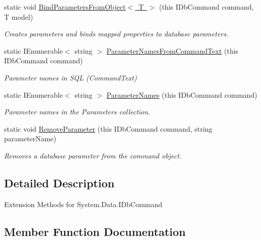 \begin{DoxyCompactItemize}
static void \mbox{\hyperlink{class_blue_cloud_1_1_extensions_1_1_data_1_1_i_db_command_extensions_ae1ef7c72419b652eba87c1c7e36ea0f9}{Bind\+Parameters\+From\+Object$<$ T $>$}} (this I\+Db\+Command command, T model)
\begin{DoxyCompactList}\small\item\em Creates parameters and binds mapped properties to database parameters. \end{DoxyCompactList}\item 
static I\+Enumerable$<$ string $>$ \mbox{\hyperlink{class_blue_cloud_1_1_extensions_1_1_data_1_1_i_db_command_extensions_a0a20fe106170359ea8bb089be6a68cc2}{Parameter\+Names\+From\+Command\+Text}} (this I\+Db\+Command command)
\begin{DoxyCompactList}\small\item\em Parameter names in S\+QL (Command\+Text) \end{DoxyCompactList}\item 
static I\+Enumerable$<$ string $>$ \mbox{\hyperlink{class_blue_cloud_1_1_extensions_1_1_data_1_1_i_db_command_extensions_afbe2b511da57a9b8c2ae9f7891b8a6cb}{Parameter\+Names}} (this I\+Db\+Command command)
\begin{DoxyCompactList}\small\item\em Parameter names in the Parameters collection. \end{DoxyCompactList}\item 
static void \mbox{\hyperlink{class_blue_cloud_1_1_extensions_1_1_data_1_1_i_db_command_extensions_af7e1bd2cfb81e60899ca6aec80b3f56a}{Remove\+Parameter}} (this I\+Db\+Command command, string parameter\+Name)
\begin{DoxyCompactList}\small\item\em Removes a database parameter from the command object. \end{DoxyCompactList}\end{DoxyCompactItemize}


\subsection{Detailed Description}
Extension Methods for System.\+Data.\+I\+Db\+Command 



\subsection{Member Function Documentation}
\mbox{\label{class_blue_cloud_1_1_extensions_1_1_data_1_1_i_db_command_extensions_ab164a63709c4d2e66f95b8b993edaf40}} 
